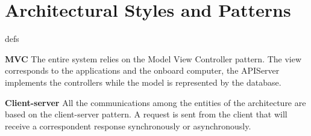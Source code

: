 \section{Architectural Styles and Patterns}

\begin{labeling}{defs}
	\item[\textbf{MVC}] The entire system relies on the Model View Controller pattern. The view corresponds to the applications and the onboard computer, the APIServer implements the controllers while the model is represented by the database.
	\item[\textbf{Client-server}] All the communications among the entities of the architecture are based on the client-server pattern. A request is sent from the client that will receive a correspondent response synchronously or asynchronously.
\end{labeling}
